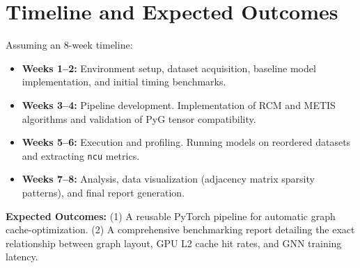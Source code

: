 \documentclass[sigconf,review]{acmart}
\begin{document}
\section{Timeline and Expected Outcomes}
Assuming an 8-week timeline:
\begin{itemize}
    \item \textbf{Weeks 1--2:} Environment setup, dataset acquisition, baseline model implementation, and initial timing benchmarks.
    \item \textbf{Weeks 3--4:} Pipeline development. Implementation of RCM and METIS algorithms and validation of PyG tensor compatibility.
    \item \textbf{Weeks 5--6:} Execution and profiling. Running models on reordered datasets and extracting \texttt{ncu} metrics.
    \item \textbf{Weeks 7--8:} Analysis, data visualization (adjacency matrix sparsity patterns), and final report generation.
\end{itemize}

\textbf{Expected Outcomes:} 
(1) A reusable PyTorch pipeline for automatic graph cache-optimization. (2) A comprehensive benchmarking report detailing the exact relationship between graph layout, GPU L2 cache hit rates, and GNN training latency.



\end{document}
